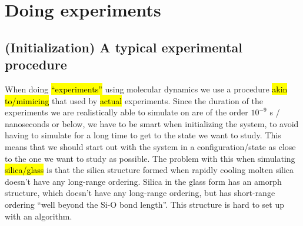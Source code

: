 \chapter{Doing experiments}
\section{(Initialization) A typical experimental procedure}
When doing \hl{``experiments''} using molecular dynamics we use a procedure \hl{akin to/mimicing} that used by \hl{actual} experiments. Since the duration of the experiments we are realistically able to simulate on are of the order $10^{-9}$ s / nanoseconds or below, we have to be smart when initializing the system, to avoid having to simulate for a long time to get to the state we want to study. This means that we should start out with the system in a configuration/state as close to the one we want to study as possible. The problem with this when simulating \hl{silica/glass} is that the silica structure formed when rapidly cooling molten silica doesn't have any long-range ordering. Silica in the glass form has an amorph structure, which doesn't have any long-range ordering, but has short-range ordering ``well beyond the Si-O bond length''. This structure is hard to set up with an algorithm.
%
%         
%         

